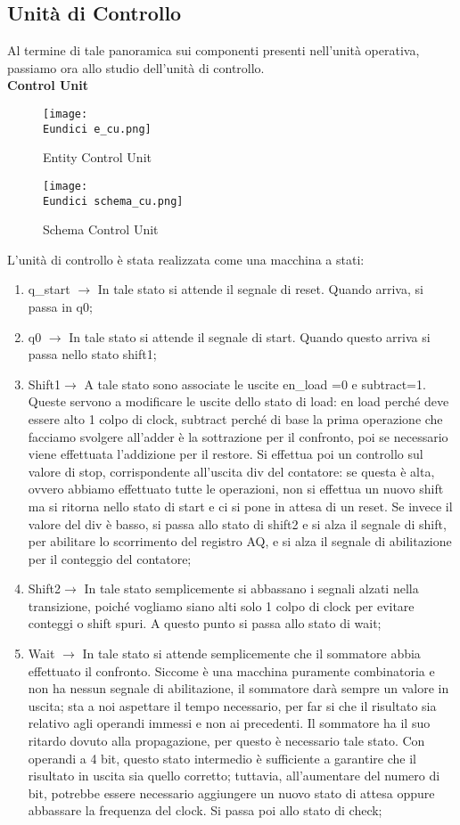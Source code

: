 \documentclass[12pt]{article}
\def \Eundici{Allegati/Esercizio11/}
\begin{document}
{\subsection{Unità di Controllo }
Al termine di tale panoramica sui componenti presenti nell’unità operativa, passiamo ora allo studio dell’unità di controllo.
\\{\large \textbf{Control Unit}}
\begin{figure}[ht!]
    \centering
    \texttt{[image: \\Eundici e\_cu.png]}
    \caption{Entity Control Unit}
\end{figure}
\clearpage
\begin{figure}[ht!]
    \centering
    \texttt{[image: \\Eundici schema\_cu.png]}
    \caption{Schema Control Unit}
\end{figure}
L’unità di controllo è stata realizzata come una macchina a stati:
\begin{enumerate}
    \item q\_start $\rightarrow$ In tale stato si attende il segnale di reset. Quando arriva, si passa in q0;
    \item q0 $\rightarrow$ In tale stato si attende il segnale di start. Quando questo arriva si passa nello stato shift1;
    \item Shift1$\rightarrow$ A tale stato sono associate le uscite en\_load =0 e subtract=1. Queste servono a modificare le uscite dello stato di load: en load perché deve essere alto 1 colpo di clock, subtract perché di base la prima operazione che facciamo svolgere all’adder è la sottrazione per il confronto, poi se necessario viene effettuata l’addizione per il restore.
          Si effettua poi un controllo sul valore di stop, corrispondente all’uscita div del contatore: se questa è alta, ovvero abbiamo effettuato tutte le operazioni, non si effettua un nuovo shift ma si ritorna nello stato di start e ci si pone in attesa di un reset. Se invece il valore del div è basso, si passa allo stato di shift2 e si alza il segnale di shift, per abilitare lo scorrimento del registro AQ, e si alza il segnale di abilitazione per il conteggio del contatore;
    \item Shift2$\rightarrow$ In tale stato semplicemente si abbassano i segnali alzati nella transizione, poiché vogliamo siano alti solo 1 colpo di clock per evitare conteggi o shift spuri. A questo punto si passa allo stato di wait;
    \item Wait $\rightarrow$ In tale stato si attende semplicemente che il sommatore abbia effettuato il confronto. Siccome è una macchina puramente combinatoria e non ha nessun segnale di abilitazione, il sommatore darà sempre un valore in uscita; sta a noi aspettare il tempo necessario, per far si che il risultato sia relativo agli operandi immessi e non ai precedenti. Il sommatore ha il suo ritardo dovuto alla propagazione, per questo è necessario tale stato. Con operandi a 4 bit, questo stato intermedio è sufficiente a garantire che il risultato in uscita sia quello corretto; tuttavia, all’aumentare del numero di bit, potrebbe essere necessario aggiungere un nuovo stato di attesa oppure abbassare la frequenza del clock. Si passa poi allo stato di check;

\end{enumerate}}
\end{document}

